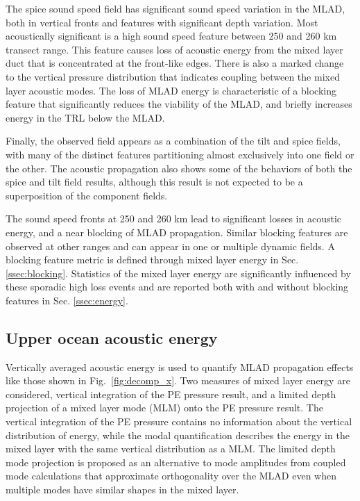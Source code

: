 \documentclass[preprint,NumberedRefs]{JASA}
\begin{document}
The spice sound speed field has significant sound speed variation in the MLAD, both in vertical fronts and features with significant depth variation. Most acoustically significant is a high sound speed feature between 250 and 260 km transect range. This feature causes loss of acoustic energy from the mixed layer duct that is concentrated at the front-like edges. There is also a marked change to the vertical pressure distribution that indicates coupling between the mixed layer acoustic modes. The loss of MLAD energy is characteristic of a blocking feature that significantly reduces the viability of the MLAD, and briefly increases energy in the TRL below the MLAD.

Finally, the observed field appears as a combination of the tilt and spice fields, with many of the distinct features partitioning almost exclusively into one field or the other. The acoustic propagation also shows some of the behaviors of both the spice and tilt field results, although this result is not expected to be a superposition of the component fields.

The sound speed fronts at 250 and 260 km lead to significant losses in acoustic energy, and a near blocking of MLAD propagation. Similar blocking features are observed at other ranges and can appear in one or multiple dynamic fields. A blocking feature metric is defined through mixed layer energy in Sec. \ref{ssec:blocking}. Statistics of the mixed layer energy are significantly influenced by these sporadic high loss events and are reported both with and without blocking features in Sec. \ref{ssec:energy}.

\subsection{Upper ocean acoustic energy}\label{ssec:bg}
Vertically averaged acoustic energy is used to quantify MLAD propagation effects like those shown in Fig.~\ref{fig:decomp_x}. Two measures of mixed layer energy are considered, vertical integration of the PE pressure result, and a limited depth projection of a mixed layer mode (MLM) onto the PE pressure result. The vertical integration of the PE pressure contains no information about the vertical distribution of energy, while the modal quantification describes the energy in the mixed layer with the same vertical distribution as a MLM. The limited depth mode projection is proposed as an alternative to mode amplitudes from coupled mode calculations that approximate orthogonality over the MLAD even when multiple modes have similar shapes in the mixed layer.
\end{document}
